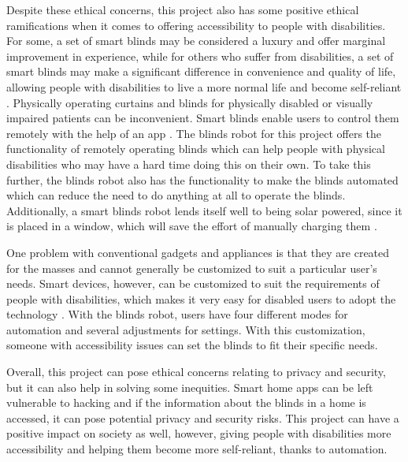 \documentclass[10pt,twocolumn]{article}
\begin{document}
Despite these ethical concerns, this project also has some positive ethical ramifications when it comes to offering accessibility to people with disabilities. For some, a set of smart blinds may be considered a luxury and offer marginal improvement in experience, while for others who suffer from disabilities, a set of smart blinds may make a significant difference in convenience and quality of life, allowing people with disabilities to live a more normal life and become self-reliant \cite{Panchwagh7Ways}. Physically operating curtains and blinds for physically disabled or visually impaired patients can be inconvenient. Smart blinds enable users to control them remotely with the help of an app \cite{Panchwagh7Ways}. The blinds robot for this project offers the functionality of remotely operating blinds which can help people with physical disabilities who may have a hard time doing this on their own. To take this further, the blinds robot also has the functionality to make the blinds automated which can reduce the need to do anything at all to operate the blinds. Additionally, a smart blinds robot lends itself well to being solar powered, since it is placed in a window, which will save the effort of manually charging them \cite{Panchwagh7Ways}.

One problem with conventional gadgets and appliances is that they are created for the masses and cannot generally be customized to suit a particular user’s needs. Smart devices, however, can be customized to suit the requirements of people with disabilities, which makes it very easy for disabled users to adopt the technology \cite{Panchwagh7Ways}. With the blinds robot, users have four different modes for automation and several adjustments for settings. With this customization, someone with accessibility issues can set the blinds to fit their specific needs.

Overall, this project can pose ethical concerns relating to privacy and security, but it can also help in solving some inequities. Smart home apps can be left vulnerable to hacking and if the information about the blinds in a home is accessed, it can pose potential privacy and security risks. This project can have a positive impact on society as well, however, giving people with disabilities more accessibility and helping them become more self-reliant, thanks to automation. 
\end{document}
